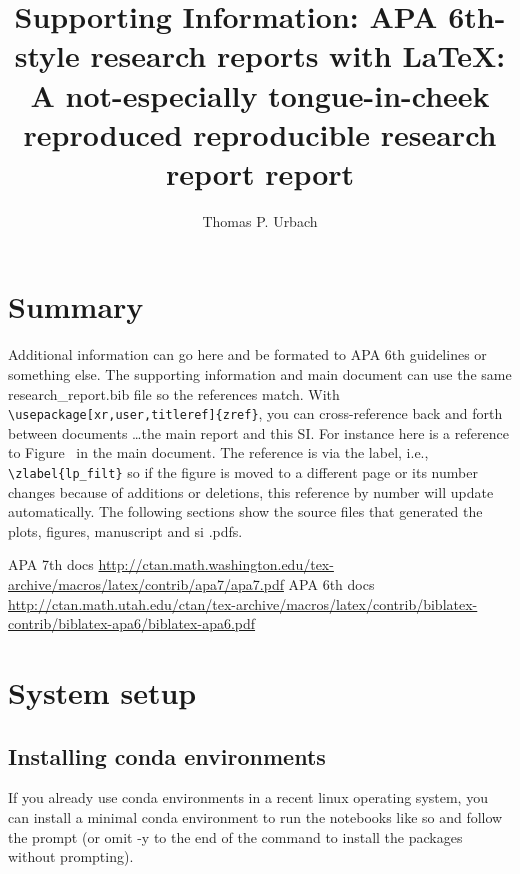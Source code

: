\documentclass[letter,doc,natbib,11pt]{apa7}  %
\title{Supporting Information: APA 6th-style research reports with LaTeX{}: A not-especially
  tongue-in-cheek reproduced reproducible research report report}\zlabel{si}
\author{Thomas P. Urbach}
\affiliation{Kutas Lab \\ Cognitive Science Department \\ University of California, San Diego}
\begin{document}
\maketitle

\tableofcontents

\section{Summary}

Additional information can go here and be formated to APA 6th
guidelines or something else. The supporting information and main
document can use the same research\_report.bib file so the references
match. With {\tt \textbackslash usepackage[xr,user,titleref]\{zref\}},
you can cross-reference back and forth between documents \ldots the
main report and this SI. For instance here is a reference to
Figure~ in the main document. The reference is via the
label, i.e., {\tt \textbackslash zlabel\{lp\_filt\}} so if the figure
is moved to a different page or its number changes because of
additions or deletions, this reference by number will update
automatically. The following sections show the source files that
generated the plots, figures, manuscript and si .pdfs.


APA 7th docs \url{http://ctan.math.washington.edu/tex-archive/macros/latex/contrib/apa7/apa7.pdf}
APA 6th docs \url{http://ctan.math.utah.edu/ctan/tex-archive/macros/latex/contrib/biblatex-contrib/biblatex-apa6/biblatex-apa6.pdf}




% 
% 
% 
% 
% 



\section{System setup}

\subsection{Installing conda environments}

If you already use conda environments in a recent linux operating
system, you can install a minimal conda environment to run the
notebooks like so and follow the prompt (or omit -y to the end of the
command to install the packages without prompting).
\end{document}

